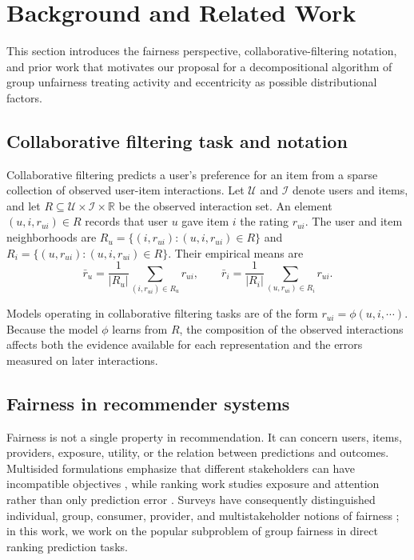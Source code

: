 \documentclass[11pt]{article}
\begin{document}
\section{Background and Related Work}
\label{sec:related-work}

This section introduces the fairness perspective, collaborative-filtering
notation, and prior work that motivates our proposal for a decompositional algorithm of group unfairness treating activity and eccentricity as
possible distributional factors.

\subsection{Collaborative filtering task and notation}

Collaborative filtering predicts a user's preference for an item from a
sparse collection of observed user-item interactions. Let $\mathcal{U}$ and
$\mathcal{I}$ denote users and items, and let
$R\subseteq\mathcal{U}\times\mathcal{I}\times\mathbb{R}$ be the observed
interaction set. An element $(u,i,r_{ui})\in R$ records that user $u$ gave
item $i$ the rating $r_{ui}$. The user and item neighborhoods are
$R_u=\{(i,r_{ui}):(u,i,r_{ui})\in R\}$ and
$R_i=\{(u,r_{ui}):(u,i,r_{ui})\in R\}$. Their empirical means are
\begin{equation}
    \bar r_u=\frac{1}{|R_u|}\sum_{(i,r_{ui})\in R_u}r_{ui},
    \qquad
    \bar r_i=\frac{1}{|R_i|}\sum_{(u,r_{ui})\in R_i}r_{ui}.
\end{equation}

Models operating in collaborative filtering tasks are of the form $ r_{ui}=\phi(u,i,\cdots)$. Because the model $\phi$ learns from $R$, the composition of the observed
interactions affects both the evidence available for each representation and
the errors measured on later interactions.

\subsection{Fairness in recommender systems}

Fairness is not a single property in recommendation. It can concern users,
items, providers, exposure, utility, or the relation between predictions and
outcomes. Multisided formulations emphasize that different stakeholders can
have incompatible objectives \cite{burke2017}, while ranking work studies
exposure and attention rather than only prediction error
\cite{singh2018,biega2018}. Surveys have consequently distinguished
individual, group, consumer, provider, and multistakeholder notions of
fairness \cite{ekstrand2018,mehrabi2021}; in this work, we work on the popular subproblem of group fairness in direct ranking prediction tasks. 
\end{document}
